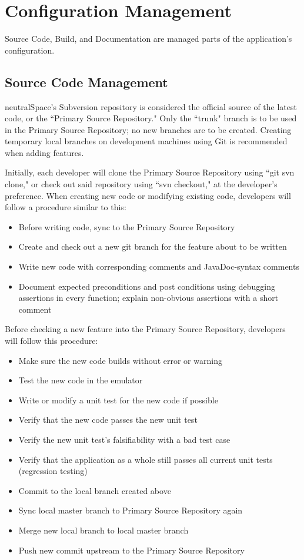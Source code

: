 \documentclass[11pt]{article}
\begin{document}
\section{Configuration Management}
	Source Code, Build, and Documentation are managed parts of the application's configuration.

	\subsection{Source Code Management}
		neutralSpace's Subversion repository is considered the official source of the latest code, or the ``Primary Source Repository." Only the ``trunk" branch is to be used in the Primary Source Repository; no new branches are to be created. Creating temporary local branches on development machines using Git is recommended when adding features.

		Initially, each developer will clone the Primary Source Repository using ``git svn clone," or check out said repository using ``svn checkout," at the developer's preference. When creating new code or modifying existing code, developers will follow a procedure similar to this:
		\begin{itemize}
			\item{Before writing code, sync to the Primary Source Repository}
			\item{Create and check out a new git branch for the feature about to be written}
			\item{Write new code with corresponding comments and JavaDoc-syntax comments}
			\item{Document expected preconditions and post conditions using debugging assertions in every function; explain non-obvious assertions with a short comment}
		\end{itemize}
		Before checking a new feature into the Primary Source Repository, developers will follow this procedure:
		\begin{itemize}
			\item{Make sure the new code builds without error or warning}
			\item{Test the new code in the emulator}
			\item{Write or modify a unit test for the new code if possible}
			\item{Verify that the new code passes the new unit test}
			\item{Verify the new unit test's falsifiability with a bad test case}
			\item{Verify that the application as a whole still passes all current unit tests (regression testing)}
			\item{Commit to the local branch created above}
			\item{Sync local master branch to Primary Source Repository again}
			\item{Merge new local branch to local master branch}
			\item{Push new commit upstream to the Primary Source Repository}
		\end{itemize}
\end{document}
